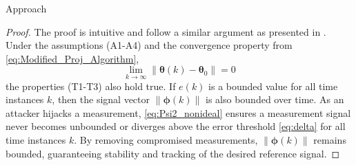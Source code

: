 \begin{section}{Approach}
\begin{proof}
The proof is intuitive and follow a similar argument as presented in \cite{tao2003adaptive}. Under the assumptions (A1-A4) and the convergence property from \eqref{eq:Modified_Proj_Algorithm},
    \begin{equation}
    \label{lemma_1_eq1}
        \lim_{k\to\infty}\|\bm{\theta}(k)-\bm{\theta}_0\|=0 \nonumber
    \end{equation}
the properties (T1-T3) also hold true. If $e(k)$ is a bounded value for all time instances $k$, then the signal vector $\lVert{\bm{\phi}}(k) \rVert$ is also bounded over time. As an attacker hijacks a measurement, \eqref{eq:Psi2_nonideal} ensures a measurement signal never becomes unbounded or diverges above the error threshold \eqref{eq:delta} for all time instances $k$. By removing compromised measurements, $\lVert{\bm{\phi}}(k) \rVert$ remains bounded, guaranteeing stability and tracking of the desired reference signal.
  
\end{proof}










\end{section}
